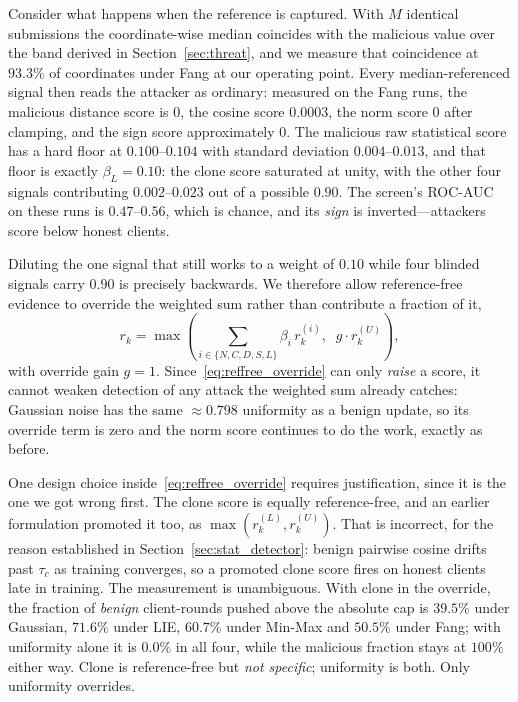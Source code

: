 \documentclass[journal]{IEEEtran}
\begin{document}
Consider what happens when the reference is captured. With $M$ identical submissions the coordinate-wise median coincides with the malicious value over the band derived in Section~\ref{sec:threat}, and we measure that coincidence at $93.3\%$ of coordinates under Fang at our operating point. Every median-referenced signal then reads the attacker as ordinary: measured on the Fang runs, the malicious distance score is $0$, the cosine score $0.0003$, the norm score $0$ after clamping, and the sign score approximately $0$. The malicious raw statistical score has a hard floor at $0.100$--$0.104$ with standard deviation $0.004$--$0.013$, and that floor is exactly $\beta_L = 0.10$: the clone score saturated at unity, with the other four signals contributing $0.002$--$0.023$ out of a possible $0.90$. The screen's ROC-AUC on these runs is $0.47$--$0.56$, which is chance, and its \emph{sign} is inverted---attackers score below honest clients.

Diluting the one signal that still works to a weight of $0.10$ while four blinded signals carry $0.90$ is precisely backwards. We therefore allow reference-free evidence to override the weighted sum rather than contribute a fraction of it,
\begin{equation}
r_k = \max\!\left( \sum_{i \in \{N,C,D,S,L\}} \beta_i\, r_k^{(i)},\;\; g \cdot r_k^{(U)} \right),
\label{eq:reffree_override}
\end{equation}
with override gain $g = 1$. Since~\eqref{eq:reffree_override} can only \emph{raise} a score, it cannot weaken detection of any attack the weighted sum already catches: Gaussian noise has the same $\approx 0.798$ uniformity as a benign update, so its override term is zero and the norm score continues to do the work, exactly as before.

One design choice inside~\eqref{eq:reffree_override} requires justification, since it is the one we got wrong first. The clone score is equally reference-free, and an earlier formulation promoted it too, as $\max(r_k^{(L)}, r_k^{(U)})$. That is incorrect, for the reason established in Section~\ref{sec:stat_detector}: benign pairwise cosine drifts past $\tau_c$ as training converges, so a promoted clone score fires on honest clients late in training. The measurement is unambiguous. With clone in the override, the fraction of \emph{benign} client-rounds pushed above the absolute cap is $39.5\%$ under Gaussian, $71.6\%$ under LIE, $60.7\%$ under Min-Max and $50.5\%$ under Fang; with uniformity alone it is $0.0\%$ in all four, while the malicious fraction stays at $100\%$ either way. Clone is reference-free but \emph{not specific}; uniformity is both. Only uniformity overrides.
\end{document}
